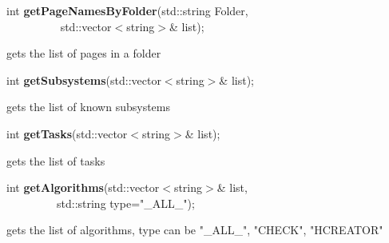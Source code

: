 \item    int {\bf getPageNamesByFolder}(std::string Folder,\\\mbox{}~~~~~~~~~
			   std::vector$<$string$>$\& list);

 gets the list of pages in a folder


\item    int {\bf getSubsystems}(std::vector$<$string$>$\& list);


 gets the list of known subsystems


\item    int {\bf getTasks}(std::vector$<$string$>$\& list);


 gets the list of tasks


\item    int {\bf getAlgorithms}(std::vector$<$string$>$\& list,\\\mbox{}~~~~~~~~~std::string type="\_ALL\_");


 gets the list of algorithms, type can be "\_ALL\_", "CHECK", "HCREATOR"


